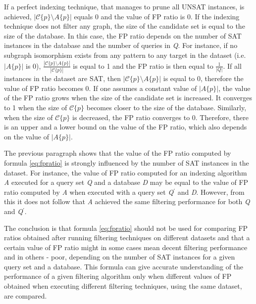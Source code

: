 \documentclass{l4proj}
\newcommand{\fancyC}{\mathcal{C}}
\begin{document}
If a perfect indexing technique, that manages to prune all UNSAT instances, is achieved, $|\fancyC\{p\} \setminus A\{p\}|$ equals 0 and the value of FP ratio is 0. If the indexing technique does not filter any graph, the size of the candidate set is equal to the size of the database. In this case, the FP ratio depends on the number of SAT instances in the database and the number of queries in \emph{Q}. For instance, if no subgraph isomorphism exists from any pattern to any target in the dataset (i.e. $|A\{p\}|$ is 0), $\frac{|\fancyC\{p\} \setminus A\{p\}|}{|\fancyC\{p\}|}$ is equal to 1 and the FP ratio is then equal to $\frac{1}{|Q|}$. If all instances in the dataset are SAT, then $|\fancyC\{p\} \setminus A\{p\}|$ is equal to 0, therefore the value of FP ratio becomes 0. If one assumes a constant value of $|A\{p\}|$, the value of the FP ratio grows when the size of the candidate set is increased. It converges to 1 when the size of $\fancyC\{p\}$ becomes closer to the size of the database. Similarly, when the size of $\fancyC\{p\}$ is decreased, the FP ratio converges to 0. Therefore, there is an upper and a lower bound on the value of the FP ratio, which also depends on the value of $|A\{p\}|$.

The previous paragraph shows that the value of the FP ratio computed by formula \ref{eq:fpratio} is strongly influenced by the number of SAT instances in the dataset. For instance, the value of FP ratio computed for an indexing algorithm \emph{A} executed for a query set \emph{Q} and a database \emph{D} may be equal to the value of FP ratio computed by \emph{A} when executed with a query set \emph{Q$^\prime$} and \emph{D}. However, from this it does not follow that \emph{A} achieved the same filtering performance for both \emph{Q} and \emph{Q$^\prime$}.

The conclusion is that formula \ref{eq:fpratio} should not be used for comparing FP ratios obtained after running filtering techniques on different datasets and that a certain value of FP ratio might in some cases mean decent filtering performance and in others - poor, depending on the number of SAT instances for a given query set and a database. This formula can give accurate understanding of the performance of a given filtering algorithm only when different values of FP obtained when executing different filtering techniques, using the same dataset, are compared.
 
\end{document}
